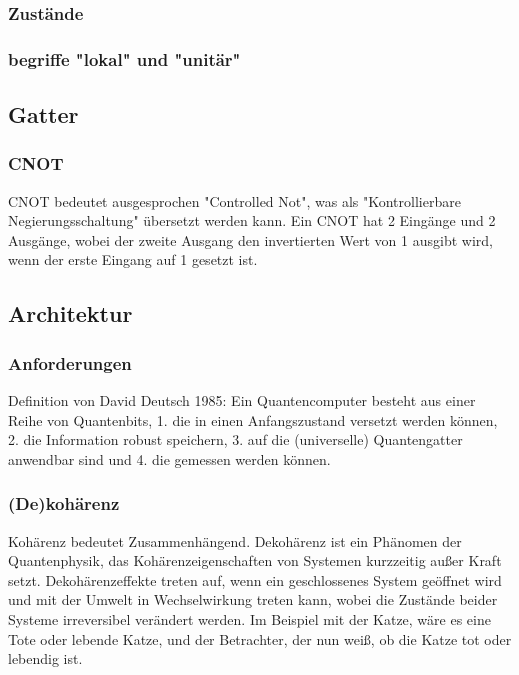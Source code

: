 \subsubsection{Zust\"ande}

\subsubsection{begriffe "lokal" und "unit\"ar"}


\subsection{Gatter}
\label{sec:Gatter}

\subsubsection{CNOT}

CNOT bedeutet ausgesprochen "Controlled Not", was als "Kontrollierbare Negierungsschaltung" übersetzt werden kann.
Ein CNOT hat 2 Eingänge und 2 Ausgänge, wobei der zweite Ausgang den invertierten Wert von 1 ausgibt wird, wenn der erste Eingang auf 1 gesetzt ist.

\subsection{Architektur}
\label{sec:Architektur}

\subsubsection{Anforderungen}

Definition von David Deutsch 1985:
Ein Quantencomputer besteht aus einer Reihe von Quantenbits,
1. die in einen Anfangszustand versetzt werden k\"onnen,
2. die Information robust speichern,
3. auf die (universelle) Quantengatter anwendbar sind und
4. die gemessen werden k\"onnen.


\subsubsection{(De)koh\"arenz}

Kohärenz bedeutet Zusammenhängend. Dekohärenz ist ein Phänomen der Quantenphysik, das Kohärenzeigenschaften von Systemen kurzzeitig außer Kraft setzt. Dekohärenzeffekte treten auf, wenn ein geschlossenes System geöffnet wird und mit der Umwelt in Wechselwirkung treten kann, wobei die Zustände beider Systeme irreversibel verändert werden.
Im Beispiel mit der Katze, wäre es eine Tote oder lebende Katze, und der Betrachter, der nun weiß, ob die Katze tot oder lebendig ist.

